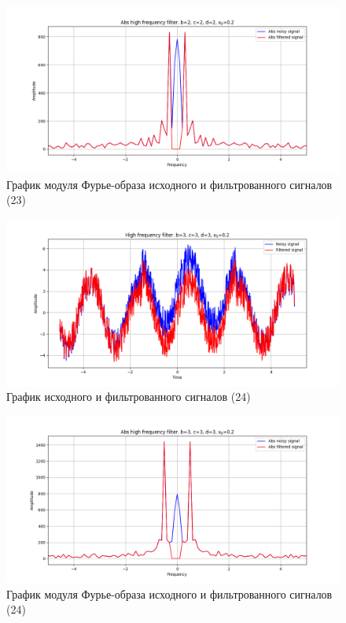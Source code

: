 \documentclass[a4paper, 12pt]{article}
\begin{document}
    \begin{figure}[!htb]
        \centering
        \includegraphics[scale=0.48]{23_abs_u_U_nolow.png}
        \captionsetup{skip=0pt}
        \caption{График модуля Фурье-образа исходного и фильтрованного сигналов (23)}
        \label{fig:fig_d}
    \end{figure}
    \begin{figure}[!htb]
        \centering
        \includegraphics[scale=0.48]{24_u_flt_u_nolow.png}
        \captionsetup{skip=0pt}
        \caption{График исходного и фильтрованного сигналов (24)}
        \label{fig:fig_e}
    \end{figure}
    \newpage
    \begin{figure}[!htb]
        \centering
        \includegraphics[scale=0.48]{24_abs_u_U_nolow.png}
        \captionsetup{skip=0pt}
        \caption{График модуля Фурье-образа исходного и фильтрованного сигналов (24)}
        \label{fig:fig_f}
    \end{figure}
\end{document}
